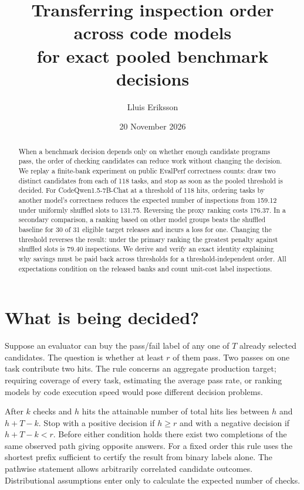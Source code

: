 \documentclass[10pt,a4paper]{article}
\title{\bfseries Transferring inspection order across code models\\for exact pooled benchmark decisions}
\author{Lluis Eriksson}
\date{20 November 2026}
\begin{document}
\maketitle
\begin{abstract}
When a benchmark decision depends only on whether enough candidate programs pass, the order of checking candidates can reduce work without changing the decision. We replay a finite-bank experiment on public EvalPerf correctness counts: draw two distinct candidates from each of 118 tasks, and stop as soon as the pooled threshold is decided. For CodeQwen1.5-7B-Chat at a threshold of 118 hits, ordering tasks by another model's correctness reduces the expected number of inspections from 159.12 under uniformly shuffled slots to 131.75. Reversing the proxy ranking costs 176.37. In a secondary comparison, a ranking based on other model groups beats the shuffled baseline for 30 of 31 eligible target releases and incurs a loss for one. Changing the threshold reverses the result: under the primary ranking the greatest penalty against shuffled slots is 79.40 inspections. We derive and verify an exact identity explaining why savings must be paid back across thresholds for a threshold-independent order. All expectations condition on the released banks and count unit-cost label inspections.
\end{abstract}
\section{What is being decided?}
Suppose an evaluator can buy the pass/fail label of any one of $T$ already selected candidates. The question is whether at least $r$ of them pass. Two passes on one task contribute two hits. The rule concerns an aggregate production target; requiring coverage of every task, estimating the average pass rate, or ranking models by code execution speed would pose different decision problems.

After $k$ checks and $h$ hits the attainable number of total hits lies between $h$ and $h+T-k$. Stop with a positive decision if $h\ge r$ and with a negative decision if $h+T-k<r$. Before either condition holds there exist two completions of the same observed path giving opposite answers. For a fixed order this rule uses the shortest prefix sufficient to certify the result from binary labels alone. The pathwise statement allows arbitrarily correlated candidate outcomes. Distributional assumptions enter only to calculate the expected number of checks.
\end{document}
